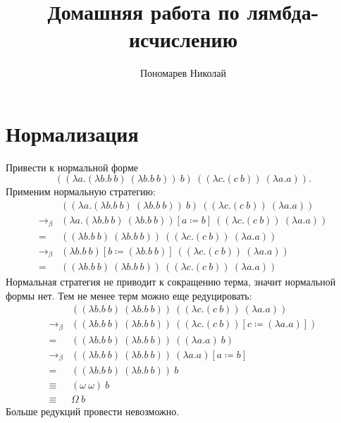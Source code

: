 \documentclass[12pt, a4paper, oneside]{memoir}
\title{Домашняя работа по лямбда-исчислению}
\author{Пономарев Николай}
\begin{document}
\maketitle

\setcounter{chapter}{1}

\section{Нормализация}

Привести к нормальной форме
\[((λa.(λb.b\ b)\ (λb.b\ b))\ b)\ ((λc.(c\ b))\ (λa.a)).\]
Применим нормальную стратегию:
\begin{align*}
                & ((λa.(λb.b\ b)\ (λb.b\ b))\ b)\ ((λc.(c\ b))\ (λa.a))           \\
    \to_\beta{} & (λa.(λb.b\ b)\ (λb.b\ b))[a \coloneq b] \ ((λc.(c\ b))\ (λa.a)) \\
    ={}         & ((λb.b\ b)\ (λb.b\ b))\ ((λc.(c\ b))\ (λa.a))                   \\
    \to_\beta{} & (λb.b\ b)[b \coloneq (λb.b\ b)]\ ((λc.(c\ b))\ (λa.a))          \\
    ={}         & ((λb.b\ b)\ (λb.b\ b))\ ((λc.(c\ b))\ (λa.a))
\end{align*}
Нормальная стратегия не приводит к сокращению терма, значит нормальной формы нет.
Тем не менее терм можно еще редуцировать:
\begin{align*}
                & ((λb.b\ b)\ (λb.b\ b))\ ((λc.(c\ b))\ (λa.a))            \\
    \to_\beta{} & ((λb.b\ b)\ (λb.b\ b))\ ((λc.(c\ b))[c \coloneq (λa.a)]) \\
    ={}         & ((λb.b\ b)\ (λb.b\ b))\ ((λa.a)\ b)                      \\
    \to_\beta{} & ((λb.b\ b)\ (λb.b\ b))\ (λa.a)[a \coloneq b]             \\
    ={}         & ((λb.b\ b)\ (λb.b\ b))\ b                                \\
    \equiv{}    & (\omega\ \omega)\ b                                      \\
    \equiv{}    & \Omega\ b
\end{align*}
Больше редукций провести невозможно.
\end{document}
